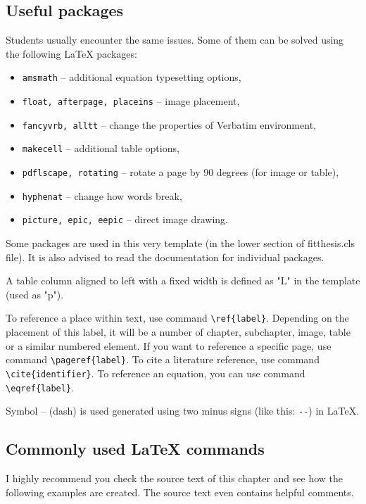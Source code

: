 \subsection*{Useful packages}

Students usually encounter the same issues. Some of them can be solved using the following \LaTeX{} packages:

\begin{itemize}
  \item \verb|amsmath| -- additional equation typesetting options,
  \item \verb|float, afterpage, placeins| -- image placement,
  \item \verb|fancyvrb, alltt| -- change the properties of Verbatim environment, 
  \item \verb|makecell| -- additional table options,
  \item \verb|pdflscape, rotating| -- rotate a page by 90 degrees (for image or table),
  \item \verb|hyphenat| -- change how words break,
  \item \verb|picture, epic, eepic| -- direct image drawing.
\end{itemize}

Some packages are used in this very template (in the lower section of fitthesis.cls file). It is also advised to read the documentation for individual packages.

A table column aligned to left with a fixed width is defined as "L" in the template (used as "p").

To reference a place within text, use command \verb|\ref{label}|. Depending on the placement of this label, it will be a number of chapter, subchapter, image, table or a similar numbered element. If you want to reference a specific page, use command \verb|\pageref{label}|. To cite a literature reference, use command \verb|\cite{identifier}|. To reference an equation, you can use command \verb|\eqref{label}|.

Symbol -- (dash) is used generated using two minus signs (like this: \verb|--|) in \LaTeX.

\subsection*{Commonly used \LaTeX{} commands}
\label{sec:Fragments}

I highly recommend you check the source text of this chapter and see how the following examples are created. The source text even contains helpful comments.

